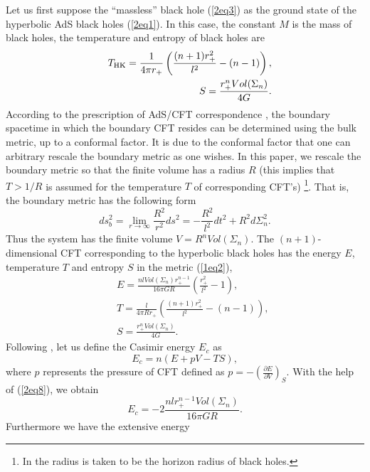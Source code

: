 \documentclass[a4paper,12pt]{article}
\begin{document}
Let us first suppose the ``massless'' black hole (\ref{2eq3}) as the ground 
state of the hyperbolic AdS black holes (\ref{2eq1}).  In this case, the 
constant $M$ is the mass of black holes, the temperature and entropy of black 
holes are 
\begin{eqnarray}
\label{2eq6}
&& T_{\rm HK} = \frac{1}{4\pi r_+}\left(\frac{(n+1) r_+^2}{l^2}-(n-1)\right),
    \nonumber \\
&& S =\frac{r_+^n Vol(\Sigma_n)} {4G}.
\end{eqnarray}
According to the prescription of AdS/CFT correspondence \cite{Gubs,Witten1},
the boundary spacetime in which the boundary CFT resides can be determined 
using the bulk metric, up to a conformal factor. It is due to the conformal 
factor that one can arbitrary rescale the boundary metric as one wishes.
In this paper, we rescale the boundary metric
so that the finite volume has a radius $R$ (this implies that $T> 1/R$ is 
assumed for the temperature $T$ of corresponding CFT's) \footnote{
In \cite{Verl}
the radius is taken to be the horizon radius of black holes.}. That is, the
boundary metric has the following form
\begin{equation}
\label{2eq7}
ds^2_b=\lim_{r \to \infty} \frac{R^2}{r^2}ds^2 =-\frac{R^2}{l^2}dt^2 +R^2 
   d\Sigma^2_n.
\end{equation} 
Thus the system has the finite volume $V= R^n Vol(\Sigma_n)$. 
The $(n+1)$-dimensional CFT corresponding to the hyperbolic  black holes 
has the energy $E$, temperature $T$ and entropy $S$ in the metric (\ref{1eq2}),
\begin{eqnarray}
\label{2eq8}
&& E =\frac{nl Vol(\Sigma_n)r_+^{n-1}}{16\pi GR}\left (\frac{r_+^2}{l^2}
    -1\right), \nonumber \\
&& T =\frac{l}{4\pi Rr_+}\left (\frac{(n+1)r_+^2}{l^2}-(n-1)\right), 
    \nonumber \\
&& S = \frac{r_+^n Vol(\Sigma_n)}{4G}.
\end{eqnarray}
Following \cite{Verl}, let us define the Casimir energy $E_c$ as
\begin{equation}
\label{2eq9}
E_c= n(E+pV -TS),
\end{equation}
where $p$ represents the pressure of CFT defined as $p=-\left(\frac{\partial E}
{\partial V}\right)_S$. With the help of (\ref{2eq8}), we obtain 
\begin{equation}
\label{2eq10}
E_c= -2 \frac{nlr_+^{n-1}Vol(\Sigma_n)}{16\pi GR}.
\end{equation}
Furthermore we have the extensive energy  
\end{document}
